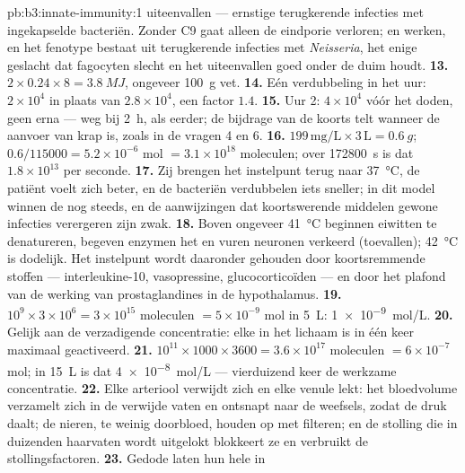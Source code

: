 \begin{solution}{pb:b3:innate-immunity:1}
uiteenvallen --- ernstige terugkerende infecties met ingekapselde
bacteriën. Zonder C9 gaat alleen de eindporie verloren;  en
 werken, en het fenotype bestaat uit terugkerende infecties
met \emph{Neisseria}, het enige geslacht dat fagocyten slecht en het
uiteenvallen goed onder de duim houdt.
\textbf{13.} $2\times 0.24\times 8 = \qty{3.8}{MJ}$, ongeveer
\qty{100}{g} vet.
\textbf{14.} Eén verdubbeling in het uur: $2\times 10^{4}$ in plaats van
$2.8\times 10^{4}$, een factor $1.4$.
\textbf{15.} Uur 2: $4\times 10^{4}$ vóór het doden, geen erna --- weg
bij \qty{2}{h}, als eerder; de bijdrage van de koorts telt wanneer de
aanvoer van  krap is, zoals in de vragen 4 en 6.
\textbf{16.} $199\,\text{mg/L}\times 3\,\text{L} = \qty{0.6}{g}$; $0.6/
\num{115000} = 5.2\times 10^{-6}$ mol $= 3.1\times 10^{18}$ moleculen;
over \qty{172800}{s} is dat $1.8\times 10^{13}$ per seconde.
\textbf{17.} Zij brengen het instelpunt terug naar \qty{37}{\celsius},
de patiënt voelt zich beter, en de bacteriën verdubbelen iets sneller;
in dit model winnen de  nog steeds, en de aanwijzingen dat
koortswerende middelen gewone infecties verergeren zijn zwak.
\textbf{18.} Boven ongeveer \qty{41}{\celsius} beginnen eiwitten te
denatureren, begeven enzymen het en vuren neuronen verkeerd
(toevallen); \qty{42}{\celsius} is dodelijk. Het instelpunt wordt
daaronder gehouden door koortsremmende stoffen --- interleukine-10,
vasopressine, glucocorticoïden --- en door het plafond van de werking
van prostaglandines in de hypothalamus.
\textbf{19.} $10^{9}\times 3\times 10^{6} = 3\times 10^{15}$ moleculen
$= 5\times 10^{-9}$ mol in \qty{5}{L}: \qty{1e-9}{mol/L}.
\textbf{20.} Gelijk aan de verzadigende concentratie: elke  in
het lichaam is in één keer maximaal geactiveerd.
\textbf{21.} $10^{11}\times 1000\times 3600 = 3.6\times 10^{17}$
moleculen $= 6\times 10^{-7}$ mol; in \qty{15}{L} is dat
\qty{4e-8}{mol/L} --- vierduizend keer de werkzame concentratie.
\textbf{22.} Elke arteriool verwijdt zich en elke venule lekt: het
bloedvolume verzamelt zich in de verwijde vaten en ontsnapt naar de
weefsels, zodat de druk daalt; de nieren, te weinig doorbloed, houden
op met filteren; en de stolling die in duizenden haarvaten wordt
uitgelokt blokkeert ze en verbruikt de stollingsfactoren.
\textbf{23.} Gedode  laten hun hele  in

\end{solution}
